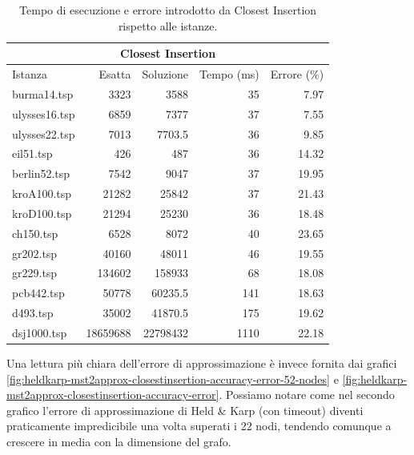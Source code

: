\begin{table}[h]
    \centering

    \begin{tabular}{lrrrr}
    \toprule
    \multicolumn{5}{c}{Closest Insertion} \\
    \hline
     Istanza       &   Esatta &        Soluzione &   Tempo (ms) &   Errore (\%) \\
    \hline
    burma14.tsp   &     3323 &   3588           &          35 &        7.97 \\
    ulysses16.tsp &     6859 &   7377           &          37 &        7.55 \\
    ulysses22.tsp &     7013 &   7703.5         &          36 &        9.85 \\
    eil51.tsp     &      426 &    487           &          36 &       14.32 \\
    berlin52.tsp  &     7542 &   9047           &          37 &       19.95 \\
    kroA100.tsp   &    21282 &  25842           &          37 &       21.43 \\
    kroD100.tsp   &    21294 &  25230           &          36 &       18.48 \\
    ch150.tsp     &     6528 &   8072           &          40 &       23.65 \\
    gr202.tsp     &    40160 &  48011           &          46 &       19.55 \\
    gr229.tsp     &   134602 & 158933           &          68 &       18.08 \\
    pcb442.tsp    &    50778 &  60235.5         &         141 &       18.63 \\
    d493.tsp      &    35002 &  41870.5         &         175 &       19.62 \\
    dsj1000.tsp   & 18659688 &   22798432       &        1110 &       22.18 \\
    \bottomrule
    \end{tabular}

    \caption{Tempo di esecuzione e errore introdotto da Closest Insertion rispetto alle istanze.}
    \label{table:closest-insertion-runtime-accuracy}
\end{table}

\noindent Una lettura più chiara dell'errore di approssimazione è invece
fornita dai grafici
\ref{fig:heldkarp-mst2approx-closestinsertion-accuracy-error-52-nodes}
 e \ref{fig:heldkarp-mst2approx-closestinsertion-accuracy-error}.
Possiamo notare come nel
secondo grafico l'errore di approssimazione di Held \& Karp (con timeout) diventi
praticamente impredicibile una volta superati i 22 nodi, tendendo comunque a crescere in media con la
dimensione del grafo.

